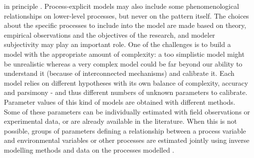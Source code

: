 in principle \citep{Connolly2017}. Process-explicit models may also include some phenomenological
relationships on lower-level processes, but never on the pattern itself.
The choices about the specific processes to include into the model are
made based on theory, empirical observations and the objectives of the
research, and modeler subjectivity may play an important role. One of
the challenges is to build a model with the appropriate amount of
complexity: a too simplistic model might be unrealistic whereas a very
complex model could be far beyond our ability to understand it (because
of interconnected mechanisms) and calibrate it. Each model relies on
different hypotheses with its own balance of complexity, accuracy and
parsimony - and thus different numbers of unknown parameters to
calibrate. Parameter values of this kind of models are obtained with
different methods. Some of these parameters can be individually
estimated with field observations or experimental data, or are already
available in the literature. When this is not possible, groups of
parameters defining a relationship between a process variable and
environmental variables or other processes are estimated jointly using
inverse modelling methods and data on the processes modelled \citep[e.g.][]{Cailleret2020, Asse2020}.

